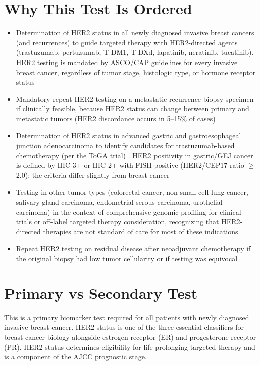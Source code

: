 \section*{Why This Test Is Ordered}
\begin{itemize}
  \item Determination of HER2 status in all newly diagnosed invasive breast cancers (and recurrences) to guide targeted therapy with HER2-directed agents (trastuzumab, pertuzumab, T-DM1, T-DXd, lapatinib, neratinib, tucatinib). HER2 testing is mandated by ASCO/CAP guidelines for every invasive breast cancer, regardless of tumor stage, histologic type, or hormone receptor status
  \item Mandatory repeat HER2 testing on a metastatic recurrence biopsy specimen if clinically feasible, because HER2 status can change between primary and metastatic tumors (HER2 discordance occurs in 5--15\% of cases)
  \item Determination of HER2 status in advanced gastric and gastroesophageal junction adenocarcinoma to identify candidates for trastuzumab-based chemotherapy (per the ToGA trial) \cite{bang2010trastuzumab}. HER2 positivity in gastric/GEJ cancer is defined by IHC 3+ or IHC 2+ with FISH-positive (HER2/CEP17 ratio $\geq$2.0); the criteria differ slightly from breast cancer
  \item Testing in other tumor types (colorectal cancer, non-small cell lung cancer, salivary gland carcinoma, endometrial serous carcinoma, urothelial carcinoma) in the context of comprehensive genomic profiling for clinical trials or off-label targeted therapy consideration, recognizing that HER2-directed therapies are not standard of care for most of these indications
  \item Repeat HER2 testing on residual disease after neoadjuvant chemotherapy if the original biopsy had low tumor cellularity or if testing was equivocal
\end{itemize}

\section*{Primary vs Secondary Test}
This is a primary biomarker test required for all patients with newly diagnosed invasive breast cancer. HER2 status is one of the three essential classifiers for breast cancer biology alongside estrogen receptor (ER) and progesterone receptor (PR). HER2 status determines eligibility for life-prolonging targeted therapy and is a component of the AJCC prognostic stage.

